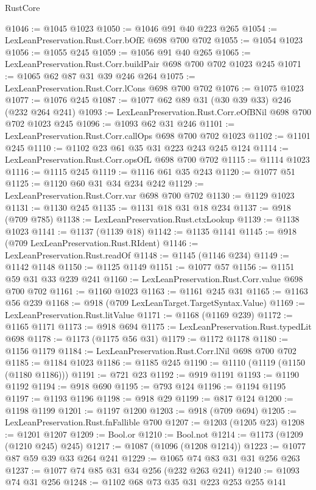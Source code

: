 \begin{lexlean}{RustCore}
\begin{coremodule}
@1046 := @1045 @1023
@1050 := @1046 @91 @40 @223 @265
@1054 := LexLeanPreservation.Rust.Corr.bOfE @698 @700 @702
@1055 := @1054 @1023
@1056 := @1055 @245
@1059 := @1056 @91 @40 @265
@1065 := LexLeanPreservation.Rust.Corr.buildPair @698 @700 @702 @1023 @245
@1071 := @1065 @62 @87 @31 @39 @246 @264
@1075 := LexLeanPreservation.Rust.Corr.lCons @698 @700 @702
@1076 := @1075 @1023
@1077 := @1076 @245
@1087 := @1077 @62 @89 @31 (@30 @39 @33) @246 (@232 @264 @241)
@1093 := LexLeanPreservation.Rust.Corr.eOfBNil @698 @700 @702 @1023 @245
@1096 := @1093 @62 @31 @246
@1101 := LexLeanPreservation.Rust.Corr.callOps @698 @700 @702 @1023
@1102 := @1101 @245
@1110 := @1102 @23 @61 @35 @31 @223 @243 @245 @124
@1114 := LexLeanPreservation.Rust.Corr.opsOfL @698 @700 @702
@1115 := @1114 @1023
@1116 := @1115 @245
@1119 := @1116 @61 @35 @243
@1120 := @1077 @51
@1125 := @1120 @60 @31 @34 @234 @242
@1129 := LexLeanPreservation.Rust.Corr.var @698 @700 @702
@1130 := @1129 @1023
@1131 := @1130 @245
@1135 := @1131 @18 @31 @18 @234
@1137 := @918 (@709 @785)
@1138 := LexLeanPreservation.Rust.ctxLookup
@1139 := @1138 @1023
@1141 := @1137 (@1139 @18)
@1142 := @1135 @1141
@1145 := @918 (@709 LexLeanPreservation.Rust.RIdent)
@1146 := LexLeanPreservation.Rust.readOf
@1148 := @1145 (@1146 @234)
@1149 := @1142 @1148
@1150 := @1125 @1149
@1151 := @1077 @57
@1156 := @1151 @59 @31 @33 @239 @241
@1160 := LexLeanPreservation.Rust.Corr.value @698 @700 @702
@1161 := @1160 @1023
@1163 := @1161 @245 @31
@1165 := @1163 @56 @239
@1168 := @918 (@709 LexLeanTarget.TargetSyntax.Value)
@1169 := LexLeanPreservation.Rust.litValue
@1171 := @1168 (@1169 @239)
@1172 := @1165 @1171
@1173 := @918 @694
@1175 := LexLeanPreservation.Rust.typedLit @698
@1178 := @1173 (@1175 @56 @31)
@1179 := @1172 @1178
@1180 := @1156 @1179
@1184 := LexLeanPreservation.Rust.Corr.lNil @698 @700 @702
@1185 := @1184 @1023
@1186 := @1185 @245
@1190 := @1110 (@1119 (@1150 (@1180 @1186)))
@1191 := @721 @23
@1192 := @919 @1191
@1193 := @1190 @1192
@1194 := @918 @690
@1195 := @793 @124
@1196 := @1194 @1195
@1197 := @1193 @1196
@1198 := @918 @29
@1199 := @817 @124
@1200 := @1198 @1199
@1201 := @1197 @1200
@1203 := @918 (@709 @694)
@1205 := LexLeanPreservation.Rust.fnFallible @700
@1207 := @1203 (@1205 @23)
@1208 := @1201 @1207
@1209 := Bool.or
@1210 := Bool.not
@1214 := @1173 (@1209 (@1210 @245) @245)
@1217 := @1087 (@1096 (@1208 @1214))
@1223 := @1077 @87 @59 @39 @33 @264 @241
@1229 := @1065 @74 @83 @31 @31 @256 @263
@1237 := @1077 @74 @85 @31 @34 @256 (@232 @263 @241)
@1240 := @1093 @74 @31 @256
@1248 := @1102 @68 @73 @35 @31 @223 @253 @255 @141

\end{coremodule}
\end{lexlean}
